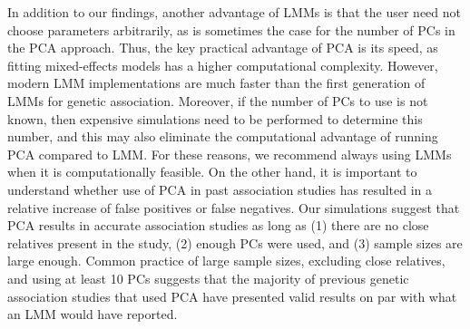 \documentclass[11pt]{article}
\begin{document}
In addition to our findings, another advantage of LMMs is that the user need not choose parameters arbitrarily, as is sometimes the case for the number of PCs in the PCA approach.
Thus, the key practical advantage of PCA is its speed, as fitting mixed-effects models has a higher computational complexity.
However, modern LMM implementations are much faster than the first generation of LMMs for genetic association.
Moreover, if the number of PCs to use is not known, then expensive simulations need to be performed to determine this number, and this may also eliminate the computational advantage of running PCA compared to LMM.
For these reasons, we recommend always using LMMs when it is computationally feasible.
On the other hand, it is important to understand whether use of PCA in past association studies has resulted in a relative increase of false positives or false negatives.
Our simulations suggest that PCA results in accurate association studies as long as
(1) there are no close relatives present in the study,
(2) enough PCs were used, and
(3) sample sizes are large enough.
Common practice of large sample sizes, excluding close relatives, and using at least 10 PCs suggests that the majority of previous genetic association studies that used PCA have presented valid results on par with what an LMM would have reported.

\printbibliography
\end{document}
